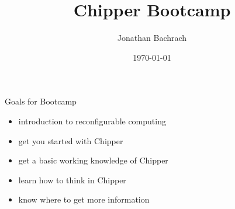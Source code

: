 \documentclass[xcolor=pdflatex,dvipsnames,table]{beamer}
\title{Chipper Bootcamp}
\author{Jonathan Bachrach}
\date{\today}
\institute[UC Berkeley]{EECS UC Berkeley}
\begin{document}
\begin{frame}
\titlepage
\end{frame}
\addtocounter{framenumber}{-1}

\begin{frame}[fragile]{Goals for Bootcamp}

\begin{itemize}
\item introduction to reconfigurable computing
\item get you started with Chipper
\item get a basic working knowledge of Chipper
\item learn how to think in Chipper
\item know where to get more information
\end{itemize}

\end{frame}
\end{document}
